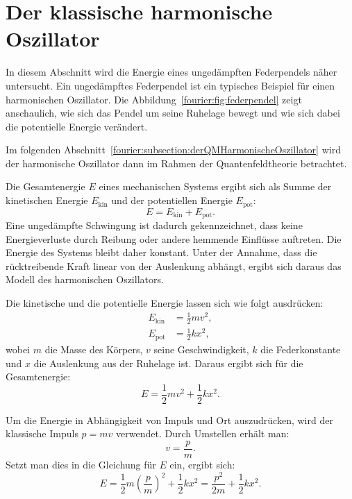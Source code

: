 %
%
%
%

\section{Der klassische harmonische Oszillator\label{fourier:section:derKlassischeHarmonischeOszillator}}

In diesem Abschnitt wird die Energie eines ungedämpften Federpendels näher untersucht.
Ein ungedämpftes Federpendel ist ein typisches Beispiel für einen harmonischen Oszillator.
Die Abbildung~\ref{fourier:fig:federpendel} zeigt anschaulich, wie sich das Pendel um seine Ruhelage bewegt und wie sich dabei die potentielle Energie verändert.

Im folgenden Abschnitt~\ref{fourier:subsection:derQMHarmonischeOszillator} wird der harmonische Oszillator dann im Rahmen der Quantenfeldtheorie betrachtet.

Die Gesamtenergie \( E \) eines mechanischen Systems ergibt sich als Summe der kinetischen Energie \( E_{\text{kin}} \) und der potentiellen Energie \( E_{\text{pot}} \):  
\begin{equation}  
	E = E_{\text{kin}} + E_{\text{pot}}.  
\end{equation}
Eine ungedämpfte Schwingung ist dadurch gekennzeichnet, dass keine Energieverluste durch Reibung oder andere hemmende Einflüsse auftreten.  
Die Energie des Systems bleibt daher konstant.  
Unter der Annahme, dass die rücktreibende Kraft linear von der Auslenkung abhängt, ergibt sich daraus das Modell des harmonischen Oszillators.

Die kinetische und die potentielle Energie lassen sich wie folgt ausdrücken:  
\begin{align}  
	E_{\text{kin}} &= \frac{1}{2} m v^2, \\  
	E_{\text{pot}} &= \frac{1}{2} k x^2,  
\end{align}  
wobei \( m \) die Masse des Körpers, \( v \) seine Geschwindigkeit, \( k \) die Federkonstante und \( x \) die Auslenkung aus der Ruhelage ist.
Daraus ergibt sich für die Gesamtenergie:  
\begin{equation}  
	E = \frac{1}{2} m v^2 + \frac{1}{2} k x^2.  
\end{equation}

Um die Energie in Abhängigkeit von Impuls und Ort auszudrücken, wird der klassische Impuls \( p = m v \) verwendet.  
Durch Umstellen erhält man:  
\[
	v = \frac{p}{m}.  
\]  
Setzt man dies in die Gleichung für \( E \) ein, ergibt sich:  
\begin{equation}\label{fourier:equation:derKlassischeHarmonischeOszillator}  
	E = \frac{1}{2} m {\left(\frac{p}{m}\right)}^{2} + \frac{1}{2} k x^{2} = \frac{p^{2}}{2m} + \frac{1}{2} k x^{2}.
\end{equation}

